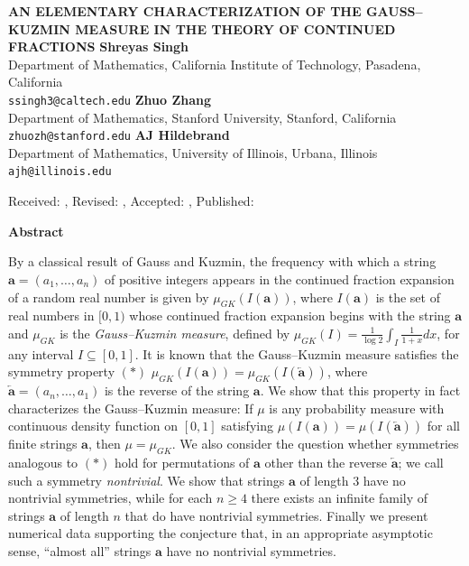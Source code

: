 \documentclass[10pt]{article}
\theoremstyle{definition}
\numberwithin{equation}{section}
\numberwithin{lemma}{section}
\newcommand{\bfa}{\mathbf{a}}
\newcommand{\bfar}{\overleftarrow{\bfa}}
\begin{document}
																													

\begin{center}
\uppercase{\bf \boldmath 
An Elementary Characterization of the 
Gauss--Kuzmin Measure in the Theory of Continued Fractions}
\vskip 20pt
{\bf Shreyas Singh }\\
{\smallit 
Department of Mathematics,
California Institute of Technology, 
Pasadena, California}\\
{\tt ssingh3@caltech.edu}
\vskip 10pt
{\bf Zhuo Zhang }\\
{\smallit 
Department of Mathematics,
Stanford University,
Stanford, California}\\
{\tt zhuozh@stanford.edu}
\vskip 10pt
{\bf AJ Hildebrand}\\
{\smallit 
Department of Mathematics, 
University of Illinois, 
Urbana, Illinois}\\
{\tt ajh@illinois.edu}
\end{center}
\vskip 20pt

\centerline{\smallit Received: , Revised: , Accepted: , Published: }
\vskip 30pt


																													



																														

\centerline{\bf Abstract}
\noindent
By a classical result of Gauss and Kuzmin, 
the frequency with which a string
$\bfa=(a_1,\dots,a_n)$ of positive integers appears in the continued
fraction expansion of a random real number
is given by $\mu_{GK}({I(\bfa)})$,
where $I(\bfa)$ is the set of real numbers in $[0,1)$ whose
continued fraction expansion begins with the string $\bfa$ and
$\mu_{GK}$ is the \emph{Gauss--Kuzmin measure}, defined by $\mu_{GK}(I)=
\frac{1}{\log 2}\int_I \frac{1}{1+x} dx$, for any interval
$I\subseteq[0,1]$. 
%
It is known that the Gauss--Kuzmin measure satisfies the symmetry
property  $(*)$ $\mu_{GK}(I(\bfa))=\mu_{GK}(I(\bfar))$, where
$\bfar=(a_n,\dots,a_1)$ is the reverse of the string $\bfa$. We show 
that this property in fact characterizes the Gauss--Kuzmin measure: If
$\mu$ is any probability measure with continuous density function on
$[0,1]$ satisfying $\mu(I(\bfa))=\mu(I(\bfar))$ for  all finite strings
$\bfa$, then $\mu=\mu_{GK}$. 
%
We also consider the question whether symmetries analogous to $(*)$ hold
for permutations of $\bfa$ other than the reverse $\bfar$; we call such
a symmetry \emph{nontrivial}. We show that  
strings $\bfa$ of length $3$ have no nontrivial symmetries,
while for each $n\ge 4$ there exists an infinite
family of strings $\bfa$ of length $n$ that do have nontrivial
symmetries. Finally we present numerical data supporting the  
conjecture that, in an appropriate asymptotic sense, ``almost all''
strings $\bfa$  have no nontrivial symmetries.
\end{document}
